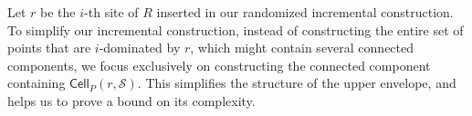 \documentclass[a4paper,UKenglish]{socg-lipics-v2018}
\newcommand{\icell}[1][i]{${#1}$-patch\xspace}
\newcommand{\icells}[1][i]{${#1}$-patches\xspace}
\newcommand{\idom}[1][i]{${#1}$-dominated\xspace}
\newcommand{\s}{\mathcal S}
\newcommand{\dd}[3][P]{\ensuremath{d_{#1}(#2, #3)}}
\newcommand{\funnel}[2][P]{\ensuremath{\sigma_{\scriptscriptstyle #1}(#2)}}
\newcommand{\cell}[2][P]{\ensuremath{\mathsf{Cell}_{\scriptscriptstyle #1}(#2)}}
\begin{document}
%
%





Let $r$ be the $i$-th site of $R$ inserted in our randomized incremental construction. 
To simplify our incremental construction, instead of constructing the entire set of points that are \idom by $r$, which might contain several connected components,
we focus exclusively on constructing the connected component containing $\cell{r, \s}$.
This simplifies the structure of the upper envelope, and helps us to prove a bound on its complexity. 
\end{document}

